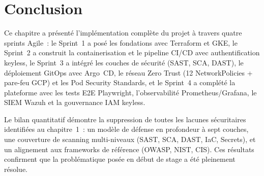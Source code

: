 \section*{Conclusion}

Ce chapitre a présenté l'implémentation complète du projet à travers quatre sprints Agile~:
le Sprint~1 a posé les fondations avec Terraform et GKE, le Sprint~2 a construit la
containerisation et le pipeline CI/CD avec authentification keyless, le Sprint~3 a intégré
les couches de sécurité (SAST, SCA, DAST), le déploiement GitOps avec Argo~CD, le réseau
Zero Trust (12 NetworkPolicies + pare-feu GCP) et les Pod Security Standards,
et le Sprint~4 a complété la plateforme avec les tests E2E Playwright, l'observabilité
Prometheus/Grafana, le SIEM Wazuh et la gouvernance IAM keyless.

Le bilan quantitatif démontre la suppression de toutes les lacunes sécuritaires identifiées
au chapitre~1~: un modèle de défense en profondeur à sept couches, une couverture de scanning
multi-niveaux (SAST, SCA, DAST, IaC, Secrets), et un alignement aux frameworks de référence
(OWASP, NIST, CIS). Ces résultats confirment que la problématique posée en début de stage
a été pleinement résolue.
